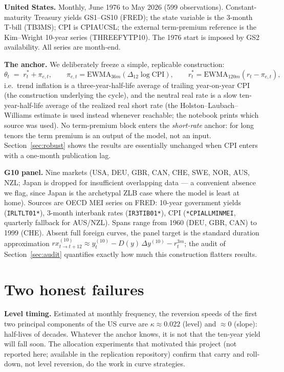 \documentclass[11pt]{article}
\begin{document}
\textbf{United States.} Monthly, June 1976 to May 2026 (599 observations). Constant-maturity
Treasury yields GS1--GS10 (FRED); the state variable is the 3-month T-bill (TB3MS); CPI is
CPIAUCSL; the external term-premium reference is the Kim--Wright 10-year series
(THREEFYTP10). The 1976 start is imposed by GS2 availability. All series are month-end.

\textbf{The anchor.} We deliberately freeze a simple, replicable construction:
\begin{equation}
\theta_t \;=\; r^*_t + \pi_{e,t},\qquad
\pi_{e,t}=\text{EWMA}_{36m}\!\left(\Delta_{12}\log \text{CPI}\right),\qquad
r^*_t=\text{EWMA}_{120m}\!\left(r_t-\pi_{e,t}\right),
\end{equation}
i.e.\ trend inflation is a three-year-half-life average of trailing year-on-year CPI
(the construction underlying the \citealp{cieslakpovala} cycle), and the neutral real rate
is a slow ten-year-half-life average of the realized real short rate (the
Holston--Laubach--Williams estimate is used instead whenever reachable; the notebook prints
which source was used). No term-premium block enters the \emph{short-rate} anchor: for long
tenors the term premium is an output of the model, not an input. Section~\ref{sec:robust}
shows the results are essentially unchanged when CPI enters with a one-month publication
lag.

\textbf{G10 panel.} Nine markets (USA, DEU, GBR, CAN, CHE, SWE, NOR, AUS, NZL; Japan is
dropped for insufficient overlapping data --- a convenient absence we flag, since Japan is
the archetypal ZLB case where the model is least at home). Sources are OECD MEI series on
FRED: 10-year government yields (\texttt{IRLTLT01*}), 3-month interbank rates
(\texttt{IR3TIB01*}), CPI (\texttt{*CPIALLMINMEI}, quarterly fallback for AUS/NZL). Spans
range from 1960 (DEU, GBR, CAN) to 1999 (CHE). Absent full foreign curves, the panel target
is the standard duration approximation
$rx^{(10)}_{t\to t+12}\approx y^{(10)}_t - D(y)\,\Delta y^{(10)} - r^{3m}_t$; the audit of
Section~\ref{sec:audit} quantifies exactly how much this construction flatters results.

\section{Two honest failures}\label{sec:failures}

\textbf{Level timing.} Estimated at monthly frequency, the reversion speeds of the first two
principal components of the US curve are $\kappa\approx 0.022$ (level) and $\approx 0$
(slope): half-lives of decades. Whatever the anchor knows, it is not that the ten-year
yield will fall soon. The allocation experiments that motivated this project (not reported
here; available in the replication repository) confirm that carry and roll-down, not level
reversion, do the work in curve strategies.
\end{document}
